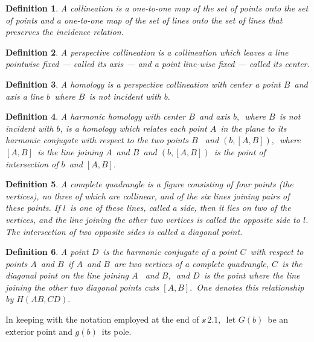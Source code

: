 \documentclass[a4paper,twoside,12pt]{article}
\newtheorem{definition}{Definition}[section]
\begin{document}
\begin{definition} A collineation is a one-to-one map of the set of
points onto the set of points and a one-to-one map of the set of lines onto
the set of lines that preserves the incidence relation.
\end{definition}

\begin{definition} A perspective collineation is a collineation which
leaves a line pointwise fixed --- called its axis --- and a point 
line-wise fixed --- called its center.
\end{definition}

\begin{definition} A homology is a perspective collineation with
center a point $B$\ and axis a line $b$\ where $B$\ is not incident with $b.$
\end{definition}

\begin{definition} A harmonic homology with center $B$\ and axis $b,$\
where $B$\ is not incident with $b$, is a homology which relates each point $%
A$\ in the plane to its harmonic conjugate with respect to the two points $B$%
\ and $(b,[A,B]),$\ where $[A,B]$\ is the line joining $A$\ and $B$\ and $%
(b,[A,B])$\ is the point of intersection of $b$\ and $[A,B].$
\end{definition}

\begin{definition} A complete quadrangle is a figure consisting of
four points (the vertices), no three of which are collinear, and of the six
lines joining pairs of these points. If $l$\ is one of these lines, called a
side, then it lies on two of the vertices, and the line joining the other
two vertices is called the opposite side to $l$. The intersection of two
opposite sides is called a diagonal point.
\end{definition}

\begin{definition} A point $D$\ is the harmonic conjugate of a point $%
C $\ with respect to points $A$\ and $B$\ if $A$\ and $B$\ are two vertices
of a complete quadrangle, $C$\ is the diagonal point on the line joining $A$%
\ and $B,$\ and $D$\ is the point where the line joining the other two
diagonal points cuts $[A,B].$\ One denotes this relationship by $H(AB,CD).$
\end{definition}

     In keeping with the notation employed at the end of $\mathcal{x}\, 2.1,$\ 
let $G(b)$\ be an exterior point and $g(b)$\ its pole.
\end{document}
